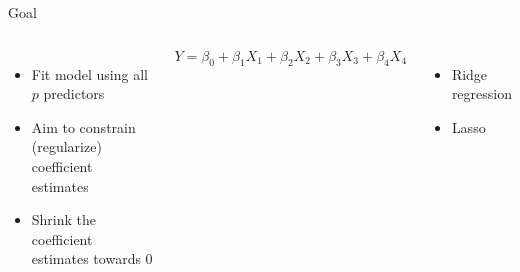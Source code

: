 \documentclass[aspectratio=169,usenames,dvipsnames]{beamer}
\newcommand{\InstructorList}[1]{
\begin{itemize}
	\color{orange}
	#1
\end{itemize}
}
\begin{document}
\begin{frame}[c]{Goal}

\begin{columns}
\centering
\begin{itemize}
	\item Fit model using all $p$ predictors
	\item Aim to constrain (regularize) coefficient estimates
	\item Shrink the coefficient estimates towards 0
\end{itemize}
\centering

\begin{equation*}
	Y = \beta_0 + \beta_1 X_1 + \beta_2 X_2 + \beta_3 X_3 + \beta_4 X_4
\end{equation*}
\InstructorList{
\item Ridge regression
\item Lasso
}
\end{columns}

\end{frame}
\end{document}
